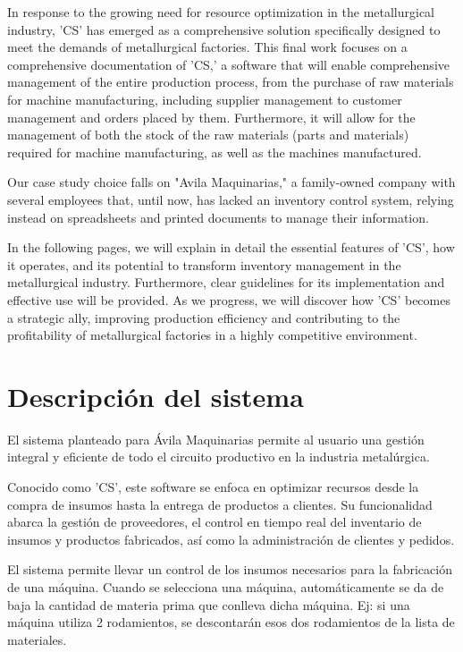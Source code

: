 \documentclass{article}
\begin{document}
	   In response to the growing need for resource optimization in the metallurgical industry, 'CS' has emerged as a comprehensive solution specifically designed to meet the demands of metallurgical factories. This final work focuses on a comprehensive documentation of 'CS,' a software that will enable comprehensive management of the entire production process, from the purchase of raw materials for machine manufacturing, including supplier management to customer management and orders placed by them. Furthermore, it will allow for the management of both the stock of the raw materials (parts and materials) required for machine manufacturing, as well as the machines manufactured.
	
	   Our case study choice falls on "Avila Maquinarias," a family-owned company with several employees that, until now, has lacked an inventory control system, relying instead on spreadsheets and printed documents to manage their information.

	   In the following pages, we will explain in detail the essential features of 'CS', how it operates, and its potential to transform inventory management in the metallurgical industry. Furthermore, clear guidelines for its implementation and effective use will be provided. As we progress, we will discover how 'CS' becomes a strategic ally, improving production efficiency and contributing to the profitability of metallurgical factories in a highly competitive environment.

\section{Descripción del sistema}

	   El sistema planteado para Ávila Maquinarias permite al usuario una gestión integral y eficiente de todo el circuito productivo en la industria metalúrgica.
	
	   Conocido como 'CS', este software se enfoca en optimizar recursos desde la compra de insumos hasta la entrega de productos a clientes. Su funcionalidad abarca la gestión de proveedores, el control en tiempo real del inventario de insumos y productos fabricados, así como la administración de clientes y pedidos. 

	   El sistema permite llevar un control de los insumos necesarios para la fabricación de una máquina. Cuando se selecciona una máquina, automáticamente se da de baja la cantidad de materia prima que conlleva dicha máquina. Ej: si una máquina utiliza 2 rodamientos, se descontarán esos dos rodamientos de la lista de materiales.
\end{document}
